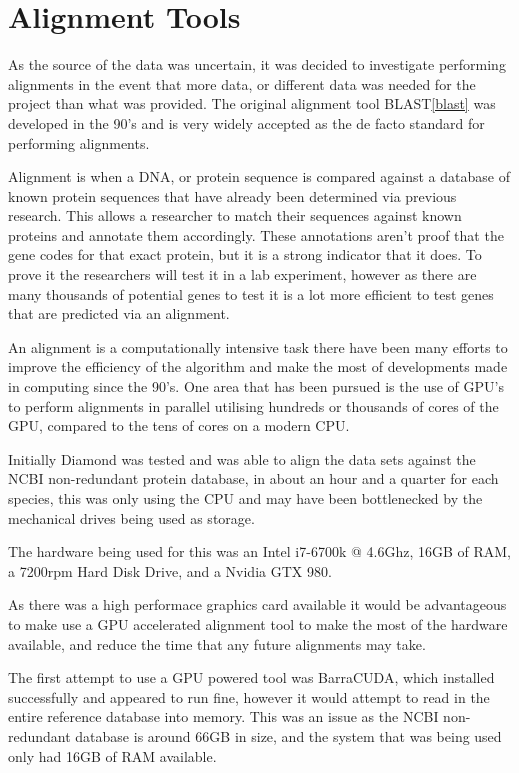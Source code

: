 \section{Alignment Tools}
As the source of the data was uncertain, it was decided to investigate performing alignments in the event that more data, or different data was needed for the project than what was provided. The original alignment tool BLAST\ref{blast} was developed in the 90's and is very widely accepted as the de facto standard for performing alignments. 

Alignment is when a DNA, or protein sequence is compared against a database of known protein sequences that have already been determined via previous research. This allows a researcher to match their sequences against known proteins and annotate them accordingly. These annotations aren't proof that the gene codes for that exact protein, but it is a strong indicator that it does. To prove it the researchers will test it in a lab experiment, however as there are many thousands of potential genes to test it is a lot more efficient to test genes that are predicted via an alignment. 

An alignment is a computationally intensive task there have been many efforts to improve the efficiency of the algorithm and make the most of developments made in computing since the 90's. One area that has been pursued is the use of GPU's to perform alignments in parallel utilising hundreds or thousands of cores of the GPU, compared to the tens of cores on a modern CPU. 

Initially Diamond\cite{diamond} was tested and was able to align the data sets against the NCBI\cite{ncbi} non-redundant protein database\cite{nr}, in about an hour and a quarter for each species, this was only using the CPU and may have been bottlenecked by the mechanical drives being used as storage. 

The hardware being used for this was an Intel i7-6700k @ 4.6Ghz, 16GB of RAM, a 7200rpm Hard Disk Drive, and a Nvidia GTX 980. 

As there was a high performace graphics card available it would be advantageous to make use a GPU accelerated alignment tool to make the most of the hardware available, and reduce the time that any future alignments may take. 

The first attempt to use a GPU powered tool was BarraCUDA\cite{barracuda}, which installed successfully and appeared to run fine, however it would attempt to read in the entire reference database into memory. This was an issue as the NCBI non-redundant database is around 66GB in size, and the system that was being used only had 16GB of RAM available. 

